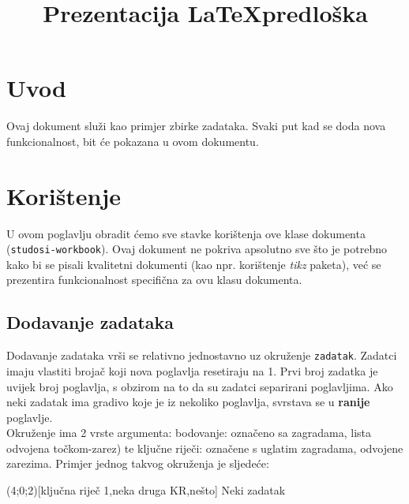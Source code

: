 \documentclass{studosi-workbook}
\begin{document}
    \title{Prezentacija \LaTeX \space predloška}
    \maketitle



    \tableofcontents



    \chapter{Uvod}\label{ch:uvod}
    Ovaj dokument služi kao primjer zbirke zadataka. Svaki put kad se doda nova
    funkcionalnost, bit će pokazana u ovom dokumentu.


    \chapter{Korištenje}\label{ch:koristenje}
    U ovom poglavlju obradit ćemo sve stavke korištenja ove klase dokumenta \\
    (\texttt{studosi-workbook}). Ovaj dokument ne pokriva apsolutno sve što je potrebno
    kako bi se pisali kvalitetni dokumenti (kao npr. korištenje \textit{tikz} paketa),
    već se prezentira funkcionalnost specifična za ovu klasu dokumenta.


    \section{Dodavanje zadataka}\label{ch:dodavanje-zadataka}
    Dodavanje zadataka vrši se relativno jednostavno uz okruženje \texttt{zadatak}. Zadatci imaju vlastiti brojač koji nova poglavlja resetiraju na 1. Prvi broj zadatka je uvijek broj poglavlja, s obzirom na to da su zadatci separirani poglavljima. Ako neki zadatak ima gradivo koje je iz nekoliko poglavlja, svrstava se u \textbf{ranije} poglavlje. \\
    
    Okruženje ima 2 vrste argumenta: bodovanje: označeno sa zagradama, lista odvojena točkom-zarez) te ključne riječi: označene s uglatim zagradama, odvojene zarezima. Primjer jednog takvog okruženja je sljedeće:

    \begin{kod}
    \begin{zadatak}(4;0;2)[ključna riječ 1,neka druga KR,nešto]
        Neki zadatak
    \end{zadatak}
    \end{kod}
\end{document}
